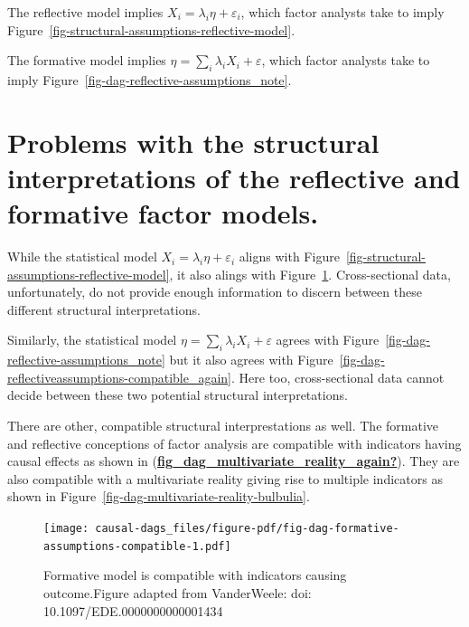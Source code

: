 \documentclass[
  singlecolumn]{report}
\begin{document}
The reflective model implies \(X_i = \lambda_i \eta + \varepsilon_i\),
which factor analysts take to imply
Figure~\ref{fig-structural-assumptions-reflective-model}.

The formative model implies
\(\eta = \sum_i\lambda_i X_i + \varepsilon\), which factor analysts take
to imply Figure~\ref{fig-dag-reflective-assumptions_note}.

\hypertarget{problems-with-the-structural-interpretations-of-the-reflective-and-formative-factor-models.}{%
\section{Problems with the structural interpretations of the reflective
and formative factor
models.}\label{problems-with-the-structural-interpretations-of-the-reflective-and-formative-factor-models.}}

While the statistical model \(X_i = \lambda_i \eta + \varepsilon_i\)
aligns with Figure~\ref{fig-structural-assumptions-reflective-model}, it
also alings with Figure~\ref{fig-dag-formative-assumptions-compatible}.
Cross-sectional data, unfortunately, do not provide enough information
to discern between these different structural interpretations.

Similarly, the statistical model
\(\eta = \sum_i\lambda_i X_i + \varepsilon\) agrees with
Figure~\ref{fig-dag-reflective-assumptions_note} but it also agrees with
Figure~\ref{fig-dag-reflectiveassumptions-compatible_again}. Here too,
cross-sectional data cannot decide between these two potential
structural interpretations.

There are other, compatible structural interprestations as well. The
formative and reflective conceptions of factor analysis are compatible
with indicators having causal effects as shown in
(\protect\hyperlink{ref-fig_dag_multivariate_reality_again}{\textbf{fig\_dag\_multivariate\_reality\_again?}}).
They are also compatible with a multivariate reality giving rise to
multiple indicators as shown in
Figure~\ref{fig-dag-multivariate-reality-bulbulia}.

\begin{figure}

{\centering \texttt{[image: causal-dags\_files/figure-pdf/fig-dag-formative-assumptions-compatible-1.pdf]}

}

\caption{\label{fig-dag-formative-assumptions-compatible}Formative model
is compatible with indicators causing outcome.Figure adapted from
VanderWeele: doi: 10.1097/EDE.0000000000001434}

\end{figure}
\end{document}

